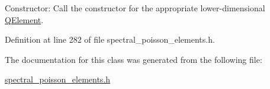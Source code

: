 Constructor\+: Call the constructor for the appropriate lower-\/dimensional \hyperlink{classoomph_1_1QElement}{Q\+Element}. 



Definition at line 282 of file spectral\+\_\+poisson\+\_\+elements.\+h.



The documentation for this class was generated from the following file\+:\begin{DoxyCompactItemize}
\item 
\hyperlink{spectral__poisson__elements_8h}{spectral\+\_\+poisson\+\_\+elements.\+h}\end{DoxyCompactItemize}
